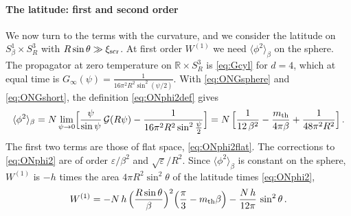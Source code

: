 \documentclass[a4paper,11pt]{article}
\newcommand{\xiscr}{\xi_{\rm scr}}
\begin{document}
\paragraph{The latitude: first and second order}
We now turn to the terms with the curvature, and we consider the latitude on $S^1_\beta\times S^3_R$ with $R\sin\theta\gg\xiscr$. At first order $W^{(1)}$ we need $\langle\phi^2\rangle_\beta$ on the sphere. The propagator at zero temperature on $\mathbb{R}\times S^3_R$ is \eqref{eq:Gcyl} for $d=4$, which at equal time is $G_\infty(\psi)=\tfrac{1}{16\pi^2R^2\sin^2(\psi/2)}$. With \eqref{eq:ONGsphere} and \eqref{eq:ONGshort}, the definition \eqref{eq:ONphi2def} gives
\begin{equation}\label{eq:ONphi2}
	\langle\phi^2\rangle_\beta=N\lim_{\psi\to0}\Bigl[\frac{\psi}{\sin\psi}\,\mathcal{G}(R\psi)-\frac{1}{16\pi^2R^2\sin^2\frac\psi2}\Bigr]
	=N\,\Bigl[\frac{1}{12\,\beta^2}-\frac{m_{\rm th}}{4\pi\beta}+\frac{1}{48\pi^2R^2}\Bigr]\, .
\end{equation}
The first two terms are those of flat space, \eqref{eq:ONphi2flat}. The corrections to \eqref{eq:ONphi2} are of order $\varepsilon/\beta^2$ and $\sqrt\varepsilon/R^2$. Since $\langle\phi^2\rangle_\beta$ is constant on the sphere, $W^{(1)}$ is $-h$ times the area $4\pi R^2\sin^2\theta$ of the latitude times \eqref{eq:ONphi2},
\begin{equation}\label{eq:ONW1}
	W^{(1)}=-N\,h\,\Bigl(\frac{R\sin\theta}{\beta}\Bigr)^{2}\Bigl(\frac\pi3-m_{\rm th}\beta\Bigr)-\frac{N\,h}{12\pi}\,\sin^2\theta\, .
\end{equation}
\end{document}
